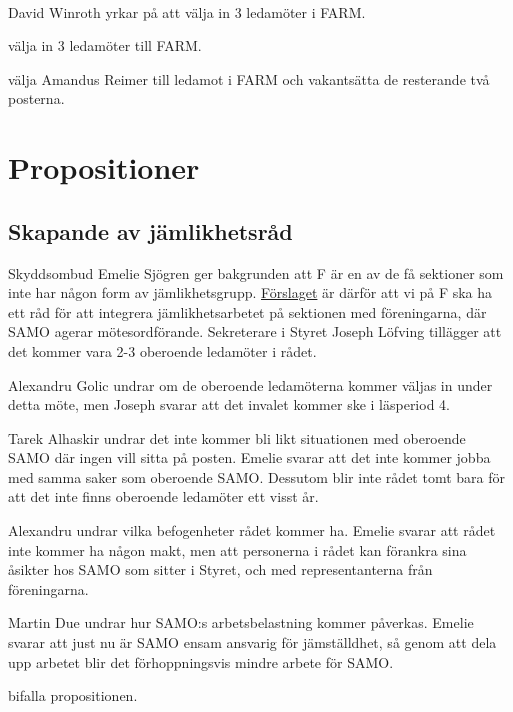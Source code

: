\documentclass[hidelinks]{sektionsmote} %
\begin{document}
\paragraph{}
David Winroth yrkar på att välja in 3 ledamöter i FARM.

\begin{beslut}
  \item välja in 3 ledamöter till FARM.
  \item välja Amandus Reimer till ledamot i FARM och vakantsätta de resterande två posterna.
\end{beslut}


\section{Propositioner}
\subsection{Skapande av jämlikhetsråd}
Skyddsombud Emelie Sjögren ger bakgrunden att F är en av de få sektioner som inte har någon form av jämlikhetsgrupp.
\hyperlink{bilagor/propjaemf.pdf.1}{Förslaget} är därför att vi på F ska ha ett råd för att integrera jämlikhetsarbetet på sektionen med föreningarna, där SAMO agerar mötesordförande.
Sekreterare i Styret Joseph Löfving tillägger att det kommer vara 2-3 oberoende ledamöter i rådet.\par
Alexandru Golic undrar om de oberoende ledamöterna kommer väljas in under detta möte, men Joseph svarar att det invalet kommer ske i läsperiod 4.\par
Tarek Alhaskir undrar det inte kommer bli likt situationen med oberoende SAMO där ingen vill sitta på posten.
Emelie svarar att det inte kommer jobba med samma saker som oberoende SAMO.
Dessutom blir inte rådet tomt bara för att det inte finns oberoende ledamöter ett visst år.\par
Alexandru undrar vilka befogenheter rådet kommer ha.
Emelie svarar att rådet inte kommer ha någon makt, men att personerna i rådet kan förankra sina åsikter hos SAMO som sitter i Styret, och med representanterna från föreningarna.\par
Martin Due undrar hur SAMO:s arbetsbelastning kommer påverkas.
Emelie svarar att just nu är SAMO ensam ansvarig för jämställdhet, så genom att dela upp arbetet blir det förhoppningsvis mindre arbete för SAMO.

\begin{beslut}
  \item bifalla propositionen.
\end{beslut}
\end{document}
